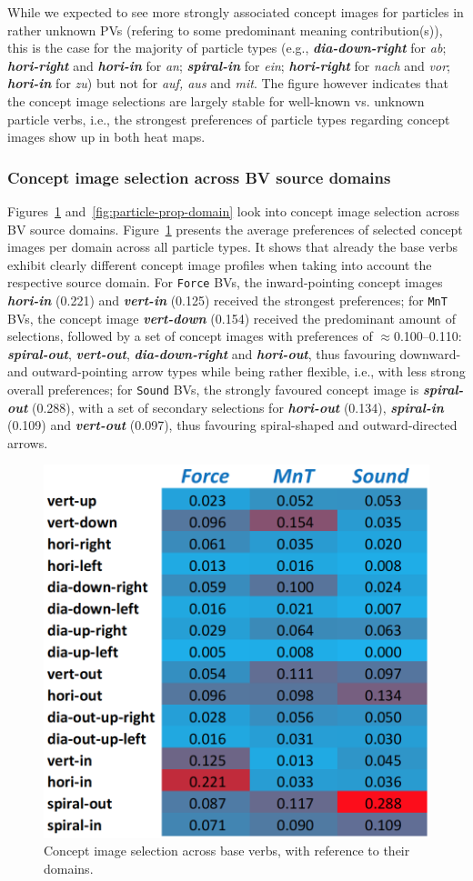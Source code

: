 \documentclass[output=paper]{langsci/langscibook}
\newcommand{\textci}[1]{\textit{\textbf{#1}}}
\begin{document}
While we expected to see more strongly associated concept images for
particles in rather unknown PVs (refering to some predominant meaning
contribution(s)), this is the case for the majority of particle types
(e.g., \textci{dia-down-right} for \textit{ab}; \textci{hori-right}
and \textci{hori-in} for \textit{an}; \textci{spiral-in} for
\textit{ein}; \textci{hori-right} for \textit{nach} and \textit{vor};
\textci{hori-in} for \textit{zu}) but not for \textit{auf, aus} and
\textit{mit}. The figure however indicates that the concept image
selections are largely stable for well-known vs. unknown particle
verbs, i.e., the strongest preferences of particle types regarding
concept images show up in both heat maps.


\subsubsection{Concept image selection across BV source domains}

Figures~\ref{fig:BV-prop-domain} and~\ref{fig:particle-prop-domain}
look into concept image selection across BV source
domains. Figure~\ref{fig:BV-prop-domain} presents the average
preferences of selected concept images per domain across all particle
types. It shows that already the base verbs exhibit clearly different
concept image profiles when taking into account the respective source
domain. For \texttt{Force} BVs, the inward-pointing concept images
\textci{hori-in} (0.221) and \textci{vert-in} (0.125) received the
strongest preferences; for \texttt{MnT} BVs, the concept image
\textci{vert-down} (0.154) received the predominant amount of
selections, followed by a set of concept images with preferences of
$\approx$0.100--0.110: \textci{spiral-out}, \textci{vert-out},
\textci{dia-down-right} and \textci{hori-out}, thus favouring
downward- and outward-pointing arrow types while being rather
flexible, i.e., with less strong overall preferences; for
\texttt{Sound} BVs, the strongly favoured concept image is
\textci{spiral-out} (0.288), with a set of secondary selections for
\textci{hori-out} (0.134), \textci{spiral-in} (0.109) and
\textci{vert-out} (0.097), thus favouring spiral-shaped and
outward-directed arrows.

\begin{figure}[htbp]
  \caption{Concept image selection across base verbs, with reference to their domains.}
  \label{fig:BV-prop-domain}
  \includegraphics[width=0.55\linewidth]{figures/dataset_particles_domains_BVs}
\end{figure}
\end{document}

